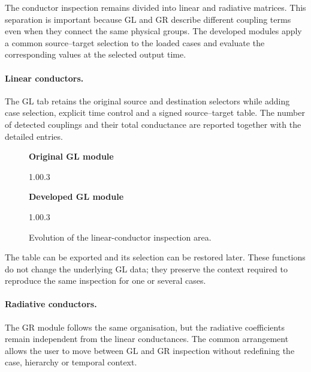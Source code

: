 The conductor inspection remains divided into linear and radiative matrices.
This separation is important because GL and GR describe different coupling
terms even when they connect the same physical groups. The developed modules
apply a common source--target selection to the loaded cases and evaluate the
corresponding values at the selected output time.

\paragraph{Linear conductors.}
The GL tab retains the original source and destination selectors while adding
case selection, explicit time control and a signed source--target table. The
number of detected couplings and their total conductance are reported together
with the detailed entries.

\begin{figure}[H]
    \centering
    \textbf{Original GL module}\par\vspace{0.5em}
        {1.0\textwidth}{0.3\textheight}

    \vspace{1em}
    \textbf{Developed GL module}\par\vspace{0.5em}
        {1.0\textwidth}{0.3\textheight}

    \caption{Evolution of the linear-conductor inspection area.}
    \label{fig:appendix_gl_conductors_evolution}
\end{figure}

The table can be exported and its selection can be restored later. These
functions do not change the underlying GL data; they preserve the context
required to reproduce the same inspection for one or several cases.

\paragraph{Radiative conductors.}
The GR module follows the same organisation, but the radiative coefficients
remain independent from the linear conductances. The common arrangement allows
the user to move between GL and GR inspection without redefining the case,
hierarchy or temporal context.

